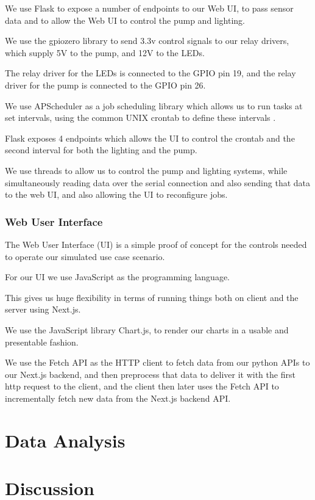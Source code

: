 \documentclass[a4paper,12pt,twoside,openright,titlepage]{book}
\begin{document}
We use Flask to expose a number of endpoints to our Web UI, to pass sensor data and to allow the Web UI to control the pump and lighting.

\bigskip

We use the gpiozero library to send 3.3v control signals to our relay drivers, which supply 5V to the pump, and 12V to the LEDs.

The relay driver for the LEDs is connected to the GPIO pin 19, and the relay driver for the pump is connected to the GPIO pin 26.

\bigskip

We use APScheduler as a job scheduling library which allows us to run tasks at set intervals, using the common UNIX crontab to define these intervals \cite{apscheduler}.

Flask exposes 4 endpoints which allows the UI to control the crontab and the second interval for both the lighting and the pump.

We use threads to allow us to control the pump and lighting systems, while simultaneously reading data over the serial connection and also sending that data to the web UI, and also allowing the UI to reconfigure jobs.

\subsection{Web User Interface}
The Web User Interface (UI) is a simple proof of concept for the controls needed to operate our simulated use case scenario.

For our UI we use JavaScript as the programming language.

This gives us huge flexibility in terms of running things both on client and the server using Next.js.

We use the JavaScript library Chart.js, to render our charts in a usable and presentable fashion.

We use the Fetch API as the HTTP client to fetch data from our python APIs to our Next.js backend, and then preprocess that data to deliver it with the first http request to the client, and the client then later uses the Fetch API to incrementally fetch new data from the Next.js backend API.

\chapter{Data Analysis}

\chapter{Discussion}
\end{document}
